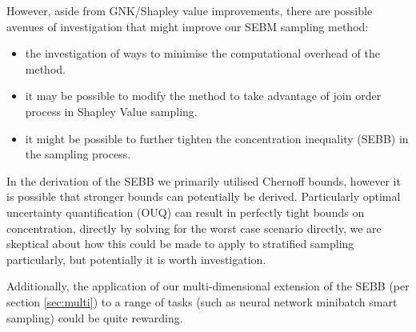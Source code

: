 However, aside from GNK/Shapley value improvements, there are possible avenues of investigation that might improve our SEBM sampling method:
\begin{itemize}
\item	the investigation of ways to minimise the computational overhead of the method.
\item	it may be possible to modify the method to take advantage of join order process in Shapley Value sampling.
\item	it might be possible to further tighten the concentration inequality (SEBB) in the sampling process.
\end{itemize}

In the derivation of the SEBB we primarily utilised Chernoff bounds, however it is possible that stronger bounds can potentially be derived.
Particularly optimal uncertainty quantification (OUQ) can result in perfectly tight bounds on concentration, directly by solving for the worst case scenario directly, we are skeptical about how this could be made to apply to stratified sampling particularly, but potentially it is worth investigation.\citep{OUQ1,doi:10.1137/13094712X}

Additionally, the application of our multi-dimensional extension of the SEBB (per section \ref{sec:multi}) to a range of tasks (such as neural network minibatch smart sampling) could be quite rewarding.








